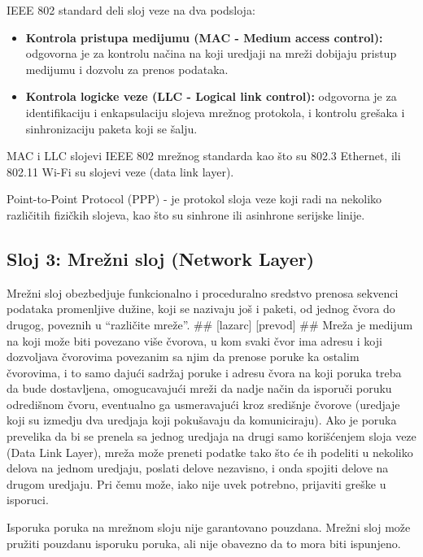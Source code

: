 \documentclass[a4paper,12pt, master]{etf}
\begin{document}
	IEEE 802 standard deli sloj veze na dva podsloja:
	\begin{itemize}
		\item \textbf{Kontrola pristupa medijumu (MAC - Medium access control):}
		odgovorna je za kontrolu na\v{c}ina na koji uredjaji na mre\v{z}i 
		dobijaju pristup medijumu i	dozvolu za prenos podataka.
		\item \textbf{Kontrola logicke veze (LLC - Logical link control):}
		odgovorna je za identifikaciju i enkapsulaciju slojeva mre\v{z}nog 
		protokola, i kontrolu gre\v{s}aka i sinhronizaciju paketa koji se 
		\v{s}alju.
	\end{itemize}

	MAC i LLC slojevi IEEE 802 mre\v{z}nog standarda kao \v{s}to su 802.3 
	Ethernet, ili 802.11 Wi-Fi su slojevi veze (data link layer).

	Point-to-Point Protocol (PPP) - je protokol sloja veze koji radi na 
	nekoliko razli\v{c}itih	fizi\v{c}kih slojeva, kao \v{s}to su sinhrone ili 
	asinhrone serijske linije.

	\subsection{Sloj 3: Mre\v{z}ni sloj (Network Layer)}

	Mre\v{z}ni sloj obezbedjuje funkcionalno i proceduralno sredstvo prenosa 
	sekvenci podataka promenljive du\v{z}ine, koji se nazivaju jo\v{s} i paketi,
	od jednog \v{c}vora do drugog, poveznih u ``razli\v{c}ite mre\v{z}e''. 
	\#\# [lazarc] [prevod] \#\# Mre\v{z}a je medijum na koji mo\v{z}e biti 
	povezano vi\v{s}e \v{c}vorova, u kom svaki \v{c}vor ima adresu i koji 
	dozvoljava \v{c}vorovima povezanim sa njim da prenose poruke ka ostalim 
	\v{c}vorovima, i to samo daju\'{c}i sadr\v{z}aj poruke i adresu \v{c}vora 
	na koji poruka treba da bude dostavljena, omogucavaju\'{c}i mre\v{z}i da 
	nadje na\v{c}in da isporu\v{c}i poruku odredi\v{s}nom \v{c}voru, eventualno 
	ga usmeravaju\'{c}i kroz sredi\v{s}nje \v{c}vorove (uredjaje koji su 
	izmedju dva uredjaja koji poku\v{s}avaju da komuniciraju). Ako je poruka 
	prevelika da bi se prenela sa jednog uredjaja na drugi samo 
	kori\v{s}\'{c}enjem sloja veze (Data Link Layer), mre\v{z}a mo\v{z}e 
	preneti podatke tako \v{s}to \'{c}e ih podeliti u nekoliko delova na jednom 
	uredjaju, poslati delove nezavisno, i onda spojiti delove na drugom 
	uredjaju. Pri \v{c}emu mo\v{z}e, iako nije uvek potrebno, prijaviti 
	gre\v{s}ke u isporuci.

	Isporuka poruka na mre\v{z}nom sloju nije garantovano pouzdana. Mre\v{z}ni 
	sloj mo\v{z}e pru\v{z}iti pouzdanu isporuku poruka, ali nije obavezno da to 
	mora biti ispunjeno.
\end{document}
